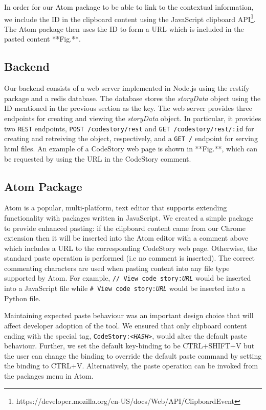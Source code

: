 \documentclass[../manifest.tex]{subfiles}
\begin{document}
In order for our Atom package to be able to link to the contextual information, we include the ID in the clipboard content using the JavaScript clipboard API\footnote{https://developer.mozilla.org/en-US/docs/Web/API/ClipboardEvent}. The Atom package then uses the ID to form a URL which is included in the pasted content **Fig.**.

\subsection{Backend}
Our backend consists of a web server implemented in Node.js using the restify package and a redis database. The database stores the \textit{storyData} object using the ID mentioned in the previous section as the key. The web server provides three endpoints for creating and viewing the \textit{storyData} object. In particular, it provides two \texttt{REST} endpoints, \texttt{POST /codestory/rest} and \texttt{GET /codestory/rest/:id} for creating and retreiving the object, respectively, and a \texttt{GET /} endpoint for serving html files. An example of a CodeStory web page is shown in **Fig.**, which can be requested by using the URL in the CodeStory comment.

\subsection{Atom Package}
Atom is a popular, multi-platform, text editor that supports extending functionality with packages written in JavaScript. We created a simple package to provide enhanced pasting: if the clipboard content came from our Chrome extension then it will be inserted into the Atom editor with a comment above which includes a URL to the corresponding CodeStory web page. Otherwise, the standard paste operation is performed (i.e no comment is inserted). The correct commenting characters are used when pasting content into any file type supported by Atom. For example, \texttt{// View code story:\textit{URL}} would be inserted into a JavaScript file while \texttt{\# View code story:\textit{URL}} would be inserted into a Python file.

Maintaining expected paste behaviour was an important design choice that will affect developer adoption of the tool. We ensured that only clipboard content ending with the special tag, \texttt{CodeStory:\textit{<HASH>}}, would alter the default paste behaviour. Further, we set the default key-binding to be CTRL+SHIFT+V but the user can change the binding to override the default paste command by setting the binding to CTRL+V. Alternatively, the paste operation can be invoked from the packages menu in Atom.
\end{document}
